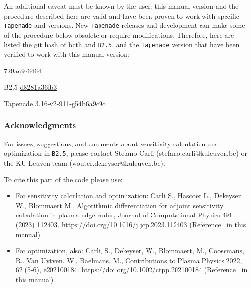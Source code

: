 An additional caveat must be known by the user: this manual version and the procedure described here are valid and have been proven to work with specific {\tt Tapenade} and \SOLPSITER versions. New {\tt Tapenade} releases and \SOLPSITER development can make some of the procedure below obsolete or require modifications. Therefore, here are listed the git hash of both \SOLPSITER and {\tt B2.5}, and the {\tt Tapenade} version that have been verified to work with this manual version:
\begin{description}
  \item{\SOLPSITER} \href{https://git.iter.org/projects/BND/repos/solps-iter/commits/729aa9c6464006dbdabf95d3e292a73328fac3c4}{729aa9c6464}
  \item{B2.5} \href{https://git.iter.org/projects/BND/repos/b2.5/commits/d8281a36fb37b2b1bd4b8fa63f2d71ed6e52745f}{d8281a36fb3}
  \item{Tapenade} \href{https://gitlab.inria.fr/tapenade/tapenade/-/commit/54b6a9c9c1ae2e4dbe0b1fcb61d0105271589b8a}{3.16-v2-911-g54b6a9c9c}
\end{description}

\subsubsection{Acknowledgments}

For issues, suggestions, and comments about sensitivity calculation and optimization in {\tt B2.5}, please contact Stefano Carli (stefano.carli@kuleuven.be) or the KU Leuven team (wouter.dekeyser@kuleuven.be).

To cite this part of the code please use:
\begin{itemize}
  \item For sensitivity calculation and optimization: Carli S., Hasco\"{e}t L., Dekeyser W., Blommaert M., Algorithmic differentiation for adjoint sensitivity calculation in plasma edge codes, Journal of Computational Physics 491 (2023) 112403. https://doi.org/10.1016/j.jcp.2023.112403 (Reference~\cite{carlijcp} in this manual)
  \item For optimization, also: Carli, S., Dekeyser, W., Blommaert, M., Coosemans, R., Van Uytven, W., Baelmans, M., Contributions to Plasma Physics 2022, 62 (5-6), e202100184. https://doi.org/10.1002/ctpp.202100184 (Reference~\cite{carlpet21} in this manual)
\end{itemize}


